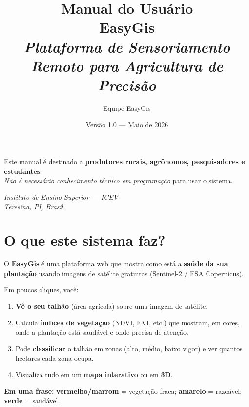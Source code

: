 \documentclass[11pt, a4paper]{article}
\title{%
  \vspace{-1.5cm}
  {\Huge\bfseries\color{accentdim} Manual do Usuário}\\[8pt]
  {\Large\bfseries EasyGis}\\[18pt]
  {\normalsize\itshape Plataforma de Sensoriamento Remoto para Agricultura de Precisão}
}
\author{Equipe EasyGis}
\date{Versão 1.0 --- Maio de 2026}
\begin{document}
\maketitle
\thispagestyle{empty}

\begin{infobox}[title={Para quem é este manual}]
Este manual é destinado a \textbf{produtores rurais, agrônomos, pesquisadores e estudantes}.\\
\textit{Não é necessário conhecimento técnico em programação} para usar o sistema.
\end{infobox}

\vfill
\begin{center}
\small\textit{Instituto de Ensino Superior --- ICEV}\\
\small\textit{Teresina, PI, Brasil}
\end{center}
\newpage

\tableofcontents
\newpage

\section{O que este sistema faz?}

O \textbf{EasyGis} é uma plataforma web que mostra como está a \textbf{saúde da sua plantação} usando imagens de satélite gratuitas (Sentinel-2 / ESA Copernicus).

Em poucos cliques, você:

\begin{enumerate}
  \item \textbf{Vê o seu talhão} (área agrícola) sobre uma imagem de satélite.
  \item Calcula \textbf{índices de vegetação} (NDVI, EVI, etc.) que mostram, em cores, onde a plantação está saudável e onde precisa de atenção.
  \item Pode \textbf{classificar} o talhão em zonas (alto, médio, baixo vigor) e ver quantos hectares cada zona ocupa.
  \item Visualiza tudo em um \textbf{mapa interativo} ou em \textbf{3D}.
\end{enumerate}

\begin{infobox}
\textbf{Em uma frase:} \textcolor{ndvilow}{\textbf{vermelho/marrom}} = vegetação fraca; \textcolor{ndvimid}{\textbf{amarelo}} = razoável; \textcolor{ndvihigh}{\textbf{verde}} = saudável.
\end{infobox}
\end{document}
